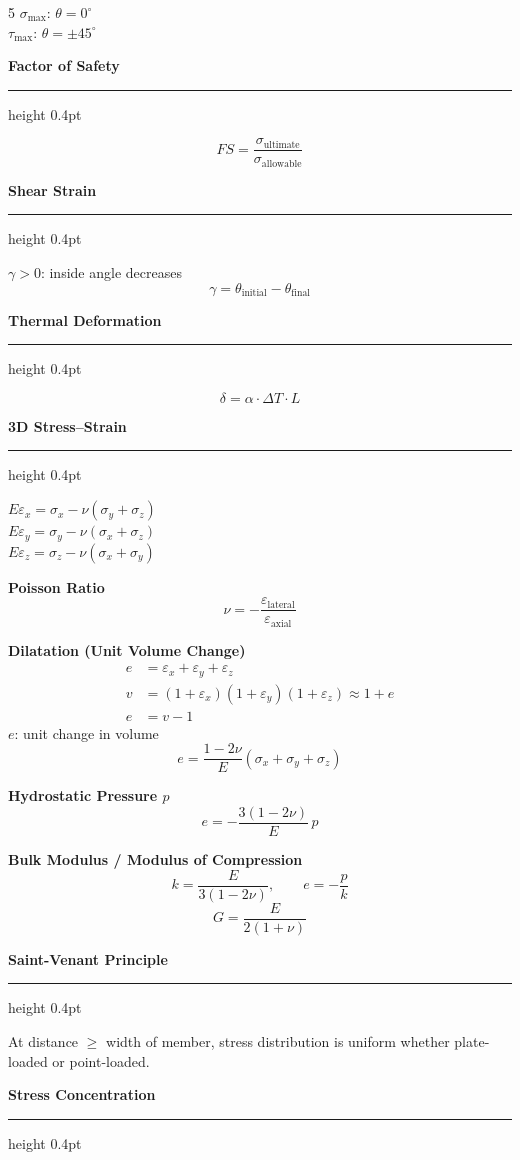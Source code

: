 \documentclass[8pt]{extarticle}
\newcommand{\sectiontitleOld}[1]{%
  \vspace{1pt}%
  {\scriptsize\textbf{#1}}%
  \vspace{0pt}%
  \hrule height 0.4pt%
  \vspace{1pt}%
}
\newcommand{\subsectiontitleOld}[1]{%
  \vspace{1pt}%
  {\scriptsize\textbf{#1}}\\[-3pt]%
}
\begin{document}
\begin{multicols*}{5}
\vspace{2pt}
$\sigma_{\text{max}}$: $\theta = 0^\circ$\\
$\tau_{\text{max}}$: $\theta = \pm 45^\circ$


\sectiontitleOld{Factor of Safety}

\[
FS = \frac{\sigma_{\text{ultimate}}}{\sigma_{\text{allowable}}}
\]

\sectiontitleOld{Shear Strain}

$\gamma > 0$: inside angle decreases
\[
\gamma = \theta_{\text{initial}} - \theta_{\text{final}}
\]

\sectiontitleOld{Thermal Deformation}

\[
\delta = \alpha \cdot \Delta T \cdot L
\]

\sectiontitleOld{3D Stress--Strain}

$E\varepsilon_x = \sigma_x - \nu(\sigma_y + \sigma_z)$\\
$E\varepsilon_y = \sigma_y - \nu(\sigma_x + \sigma_z)$\\
$E\varepsilon_z = \sigma_z - \nu(\sigma_x + \sigma_y)$

\vspace{2pt}
\subsectiontitleOld{Poisson Ratio}
\[
\nu = -\frac{\varepsilon_{\text{lateral}}}{\varepsilon_{\text{axial}}}
\]

\subsectiontitleOld{Dilatation (Unit Volume Change)}
\vspace{-10pt}
{\footnotesize\begin{align*}
e &= \varepsilon_x + \varepsilon_y + \varepsilon_z \\
v &= (1+\varepsilon_x)(1+\varepsilon_y)(1+\varepsilon_z) \approx 1 + e \\
e &= v - 1
\end{align*}}
$e$: unit change in volume
\[
e = \frac{1-2\nu}{E}\left(\sigma_x + \sigma_y + \sigma_z\right)
\]

\subsectiontitleOld{Hydrostatic Pressure $p$}
\[
e = -\frac{3(1-2\nu)}{E}\,p
\]

\subsectiontitleOld{Bulk Modulus / Modulus of Compression}
\[
k = \frac{E}{3(1-2\nu)}, \qquad e = -\frac{p}{k}
\]
\[
G = \frac{E}{2(1+\nu)}
\]

\sectiontitleOld{Saint-Venant Principle}

At distance $\geq$ width of member, stress distribution is uniform whether plate-loaded or point-loaded.

\columnbreak

\sectiontitleOld{Stress Concentration}


\end{multicols*}
\end{document}
